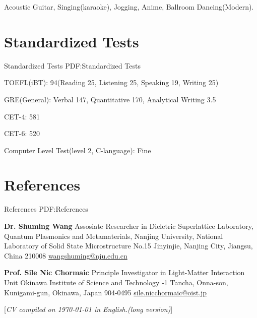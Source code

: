 \documentclass[letterpaper,MMMyyyy,nonstop]{simpleresumecv}
\newcommand{\CVNote}{CV compiled on {\today} in English.(long version)}
\begin{document}
\begin{body}
Acoustic Guitar,
Singing(karaoke),
Jogging,
Anime,
Ballroom Dancing(Modern).


\section
{Standardized Tests}
{Standardized Tests}
{PDF:Standardized Tests}

\BulletItem
TOEFL(iBT): 94(Reading 25, Listening 25, Speaking 19, Writing 25)
\hfill
{}

\BulletItem
GRE(General): Verbal 147, Quantitative 170, Analytical Writing 3.5
\hfill
{}

\BulletItem
CET-4: 581
\hfill
{}

\BulletItem
CET-6: 520
\hfill
{}

\BulletItem
Computer Level Test(level 2, C-language): Fine
\hfill
{}



\section
{References}
{References}
{PDF:References}

\BulletItem
\textbf{Dr. Shuming Wang}
\newline
Assosiate Researcher in Dieletric Superlattice Laboratory,
\newline
Quantum Plasmonics and Metamaterials,
\newline
Nanjing University, National Laboratory of Solid State Microstructure
\newline
No.15 Jinyinjie, Nanjing City, Jiangsu, China 210008
\newline
\href{wangshuming@nju.edu.cn}
{wangshuming@nju.edu.cn}

\BigGap
\BulletItem
\textbf{Prof. Sile Nic Chormaic}
\newline
Principle Investigator in Light-Matter Interaction Unit
\newline
Okinawa Institute of Science and Technology
-1 Tancha, Onna-son, Kunigami-gun, Okinawa, Japan 904-0495
\newline
\href{sile.nicchormaic@oist.jp}
{sile.nicchormaic@oist.jp}

\end{body}


\UseNoteFont%
\null\hfill%
[\textit{\CVNote}]%
\hspace{2.0mm}\null
\end{document}
